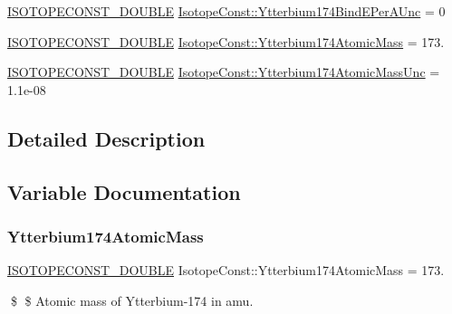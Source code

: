 \begin{DoxyCompactItemize}
\mbox{\hyperlink{group___isotope_const-_macros_ga8f45a7272ce02c0b4c65c44636ed719a}{I\+S\+O\+T\+O\+P\+E\+C\+O\+N\+S\+T\+\_\+\+D\+O\+U\+B\+LE}} \mbox{\hyperlink{group___isotope_const-_ytterbium-_yb174_ga72f68bde3928910c0ac615bafb83730f}{Isotope\+Const\+::\+Ytterbium174\+Bind\+E\+Per\+A\+Unc}} = 0
\item 
\mbox{\hyperlink{group___isotope_const-_macros_ga8f45a7272ce02c0b4c65c44636ed719a}{I\+S\+O\+T\+O\+P\+E\+C\+O\+N\+S\+T\+\_\+\+D\+O\+U\+B\+LE}} \mbox{\hyperlink{group___isotope_const-_ytterbium-_yb174_ga16a6001eb64f3396eac3f15008c679b1}{Isotope\+Const\+::\+Ytterbium174\+Atomic\+Mass}} = 173.
\item 
\mbox{\hyperlink{group___isotope_const-_macros_ga8f45a7272ce02c0b4c65c44636ed719a}{I\+S\+O\+T\+O\+P\+E\+C\+O\+N\+S\+T\+\_\+\+D\+O\+U\+B\+LE}} \mbox{\hyperlink{group___isotope_const-_ytterbium-_yb174_gaeb71d92f8f98de8de2e3400215e54426}{Isotope\+Const\+::\+Ytterbium174\+Atomic\+Mass\+Unc}} = 1.\+1e-\/08
\end{DoxyCompactItemize}


\subsection{Detailed Description}


\subsection{Variable Documentation}
\mbox{\label{group___isotope_const-_ytterbium-_yb174_ga16a6001eb64f3396eac3f15008c679b1}} 
\subsubsection{\texorpdfstring{Ytterbium174\+Atomic\+Mass}{Ytterbium174AtomicMass}}
{\footnotesize\ttfamily \mbox{\hyperlink{group___isotope_const-_macros_ga8f45a7272ce02c0b4c65c44636ed719a}{I\+S\+O\+T\+O\+P\+E\+C\+O\+N\+S\+T\+\_\+\+D\+O\+U\+B\+LE}} Isotope\+Const\+::\+Ytterbium174\+Atomic\+Mass = 173.}

\$ \$ Atomic mass of Ytterbium-\/174 in amu. \mbox{\label{group___isotope_const-_ytterbium-_yb174_gaeb71d92f8f98de8de2e3400215e54426}} 
